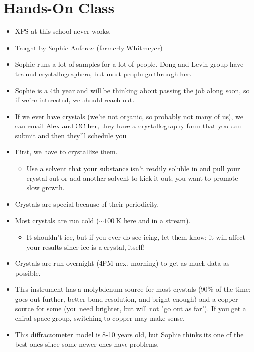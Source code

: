 \documentclass[../notes.tex]{subfiles}
\begin{document}
\section{Hands-On Class}
\begin{itemize}
    \item {}XPS at this school never works.
    \item Taught by Sophie Anferov (formerly Whitmeyer).
    \item Sophie runs a lot of samples for a lot of people. Dong and Levin group have trained crystallographers, but most people go through her.
    \item Sophie is a 4th year and will be thinking about passing the job along soon, so if we're interested, we should reach out.
    \item If we ever have crystals (we're not organic, so probably not many of us), we can email Alex and CC her; they have a crystallography form that you can submit and then they'll schedule you.
    \item First, we have to crystallize them.
    \begin{itemize}
        \item Use a solvent that your substance isn't readily soluble in and pull your crystal out or add another solvent to kick it out; you want to promote slow growth.
    \end{itemize}
    \item Crystals are special because of their periodicity.
    \item Most crystals are run cold ($\sim\SI{100}{\kelvin}$ here and in a  stream).
    \begin{itemize}
        \item It shouldn't ice, but if you ever do see icing, let them know; it will affect your results since ice is a crystal, itself!
    \end{itemize}
    \item Crystals are run overnight (4PM-next morning) to get as much data as possible.
    \item This instrument has a molybdenum source for most crystals (90\% of the time; goes out further, better bond resolution, and bright enough) and a copper source for some (you need brighter, but will not "go out as far"). If you get a chiral space group, switching to copper may make sense.
    \item This diffractometer model is 8-10 years old, but Sophie thinks its one of the best ones since some newer ones have problems.

\end{itemize}
\end{document}
